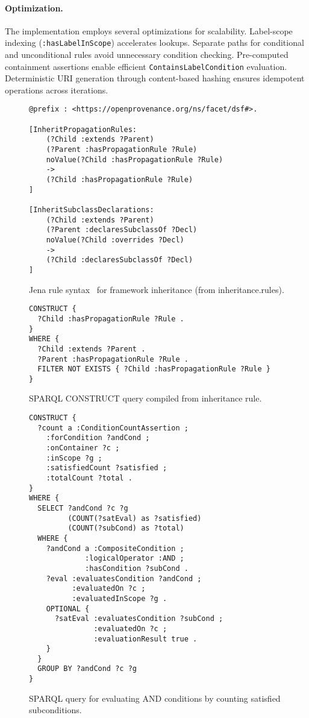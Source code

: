 \documentclass{IOS-Book-Article}
\begin{document}
\paragraph{Optimization.}
The implementation employs several optimizations for scalability. Label-scope indexing ({\footnotesize\texttt{:hasLabelInScope}}) accelerates lookups. Separate paths for conditional and unconditional rules avoid unnecessary condition checking. Pre-computed containment assertions enable efficient {\footnotesize\texttt{ContainsLabelCondition}} evaluation. Deterministic URI generation through content-based hashing ensures idempotent operations across iterations.

\begin{figure}[ht]
\begin{lstlisting}[basicstyle=\ttfamily, frame=none]
@prefix : <https://openprovenance.org/ns/facet/dsf#>.

[InheritPropagationRules:
    (?Child :extends ?Parent)
    (?Parent :hasPropagationRule ?Rule)
    noValue(?Child :hasPropagationRule ?Rule)
    ->
    (?Child :hasPropagationRule ?Rule)
]

[InheritSubclassDeclarations:
    (?Child :extends ?Parent)
    (?Parent :declaresSubclassOf ?Decl)
    noValue(?Child :overrides ?Decl)
    ->
    (?Child :declaresSubclassOf ?Decl)
]
\end{lstlisting}
\caption{Jena rule syntax~\cite{jena} for framework inheritance (from inheritance.rules).}
\label{fig:appendix-jena-rule}
\end{figure}

\begin{figure}[ht]
\begin{lstlisting}[basicstyle=\ttfamily, frame=none, language=SPARQL]
CONSTRUCT {
  ?Child :hasPropagationRule ?Rule .
}
WHERE {
  ?Child :extends ?Parent .
  ?Parent :hasPropagationRule ?Rule .
  FILTER NOT EXISTS { ?Child :hasPropagationRule ?Rule }
}
\end{lstlisting}
\caption{SPARQL CONSTRUCT query compiled from inheritance rule.}
\label{fig:appendix-sparql-construct}
\end{figure}

\begin{figure}[ht]
\begin{lstlisting}[basicstyle=\ttfamily, frame=none, language=SPARQL]
CONSTRUCT {
  ?count a :ConditionCountAssertion ;
    :forCondition ?andCond ;
    :onContainer ?c ;
    :inScope ?g ;
    :satisfiedCount ?satisfied ;
    :totalCount ?total .
}
WHERE {
  SELECT ?andCond ?c ?g
         (COUNT(?satEval) as ?satisfied)
         (COUNT(?subCond) as ?total)
  WHERE {
    ?andCond a :CompositeCondition ;
             :logicalOperator :AND ;
             :hasCondition ?subCond .
    ?eval :evaluatesCondition ?andCond ;
          :evaluatedOn ?c ;
          :evaluatedInScope ?g .
    OPTIONAL {
      ?satEval :evaluatesCondition ?subCond ;
               :evaluatedOn ?c ;
               :evaluationResult true .
    }
  }
  GROUP BY ?andCond ?c ?g
}
\end{lstlisting}
\caption{SPARQL query for evaluating AND conditions by counting satisfied subconditions.}
\label{fig:appendix-and-condition}
\end{figure}
\end{document}
